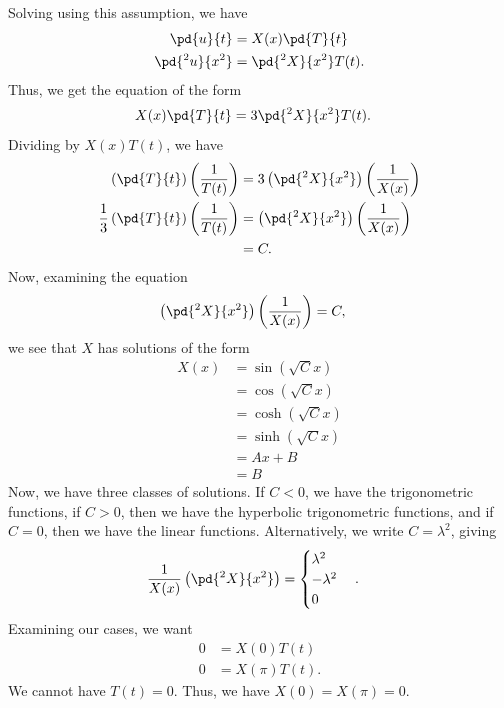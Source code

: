 \documentclass[10pt]{mypackage}
\begin{document}
\begin{example}
  Solving using this assumption, we have
  \begin{align*}
    \pd{u}{t} &= X(x)\pd{T}{t}\\
    \pd{^2u}{x^2} &= \pd{^2X}{x^2}T(t).
  \end{align*}
  Thus, we get the equation of the form
  \begin{align*}
    X(x) \pd{T}{t} &= 3 \pd{^2X}{x^2}T(t).
  \end{align*}
  Dividing by $X(x)T(t)$, we have
  \begin{align*}
    \left( \pd{T}{t} \right)\left( \frac{1}{T(t)}  \right) &= 3 \left( \pd{^2X}{x^2} \right)\left( \frac{1}{X(x)} \right)\\
    \frac{1}{3}\left( \pd{T}{t} \right)\left( \frac{1}{T(t)} \right) &= \left( \pd{^2X}{x^2} \right)\left( \frac{1}{X(x)} \right)\\
                                                                     &= C.
  \end{align*}
  Now, examining the equation
  \begin{align*}
    \left( \pd{^2 X}{x^2} \right)\left( \frac{1}{X(x)} \right) &= C,
  \end{align*}
  we see that $X$ has solutions of the form
  \begin{align*}
    X(x) &= \sin\left( \sqrt{C}x \right)\\
         &= \cos\left( \sqrt{C}x \right)\\
         &= \cosh\left( \sqrt{C}x \right)\\
         &= \sinh\left( \sqrt{C}x \right)\\
         &= Ax + B\\
         &= B
  \end{align*}
  Now, we have three classes of solutions. If $C < 0$, we have the trigonometric functions, if $C > 0$, then we have the hyperbolic trigonometric functions, and if $C = 0$, then we have the linear functions. Alternatively, we write $C = \lambda^2$, giving
  \begin{align*}
    \frac{1}{X(x)} \left( \pd{^2X}{x^2} \right) &= \begin{cases}
      \lambda^2\\ -\lambda^2 \\ 0
    \end{cases}.
  \end{align*}
  Examining our cases, we want
  \begin{align*}
    0 &= X(0)T(t)\\
    0 &= X(\pi)T(t).
  \end{align*}
  We cannot have $T(t) = 0$. Thus, we have $X(0) = X(\pi) = 0$.\newline


\end{example}
\end{document}

